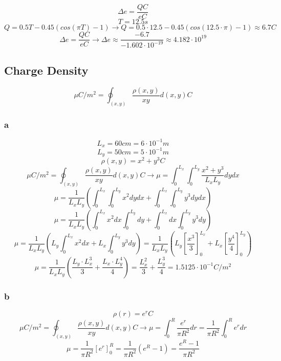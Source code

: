 \[\Delta e = \frac{Q \unit{C}}{e \unit{C}}\]
\[T = 12.5 \unit{s}\]
\[
	Q = 0.5 T - 0.45 ( cos(\pi T) - 1)
	\to Q = 0.5 \cdot 12.5 - 0.45 ( cos(12.5 \cdot \pi) - 1)
	\approx 6.7 \unit{C}
\]
\[
	\Delta e = \frac{Q \unit{C}}{e \unit{C}}
	\to \Delta e \approx \frac{- 6.7}{- 1.602 \cdot 10^{-19}}
	\approx 4.182 \cdot 10^{19}
\]

\subsection{Charge Density}

\[\mu \unit{C/m^2} = \oint_{(x,y)} \frac{\rho(x,y)}{xy} d(x,y) \unit{C}\]

\subsubsection{a}
\[L_x	= 60 \unit{cm}	= 6 \cdot 10^{-1} \unit{m}\]
\[L_y	= 50 \unit{cm}	= 5 \cdot 10^{-1} \unit{m}\]
\[\rho(x,y) = x^2 + y^3 \unit{C} \]
\[
	\mu \unit{C/m^2} = \oint_{(x,y)} \frac{\rho(x,y)}{xy}d(x,y) \unit{C}
	\to \mu = \int_0^{L_x} \int_0^{L_y} \frac{x^2 + y^3}{L_x L_y} dy dx
\]
\[
	\mu = \frac{1}{L_x L_y} \left ( \int_0^{L_x} \int_0^{L_y} x^2 dy dx
	+ \int_0^{L_x} \int_0^{L_y} y^3 dy dx \right )
\]
\[
	\mu= \frac{1}{L_x L_y} \left ( \int_0^{L_x} x^2 dx \int_0^{L_y} dy
	+ \int_0^{L_x} dx \int_0^{L_y} y^3 dy \right )
\]
\[
	\mu = \frac{1}{L_x L_y} \left ( L_y \int_0^{L_x} x^2 dx
	+ L_x \int_0^{L_y} y^3 dy \right )
	= \frac{1}{L_x L_y} \left ( L_y \left [ \frac{x^3}{3} \right ]_0^{L_x}
	+ L_x \left [ \frac{y^4}{4} \right ]_0^{L_y} \right )
\]
\[
	\mu = \frac{1}{L_x L_y} \left ( \frac{L_y \cdot L_x^3}{3}
	+ \frac{L_x \cdot L_y^4}{4} \right )
	= \frac{L_x^2}{3} + \frac{L_y^3}{4}
	= 1.5125 \cdot 10^{-1} \unit{C/m^2}
\]

\subsubsection{b}

\[\rho(r) =  e^r \unit{C} \]
\[
	\mu \unit{C/m^2} = \oint_{(x,y)} \frac{\rho(x,y)}{xy} d(x,y) \unit{C}
	\to \mu = \int_0^R \frac{e^r}{\pi R^2} dr
	= \frac{1}{\pi R^2} \int_0^R e^r dr
\]
\[
	\mu = \frac{1}{\pi R^2} [e^r]_0^R
	= \frac{1}{\pi R^2} (e^R - 1)
	= \frac{e^R - 1}{\pi R^2}
\]

